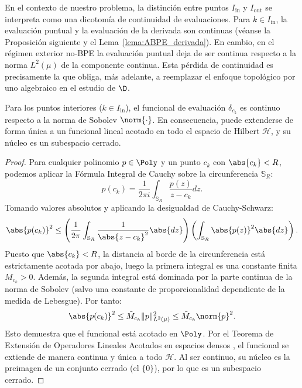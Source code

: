 En el contexto de nuestro problema, la distinción entre puntos $I_{\mathrm{in}}$ y $I_{\mathrm{out}}$ se interpreta como una dicotomía de continuidad de evaluaciones. Para $k\in I_{\mathrm{in}}$, la evaluación puntual y la evaluación de la derivada son continuas (véanse la Proposición siguiente y el Lema~\ref{lema:ABPE_derivada}). En cambio, en el régimen exterior no-BPE la evaluación puntual deja de ser continua respecto a la norma $L^2(\mu)$ de la componente continua. Esta pérdida de continuidad es precisamente la que obliga, más adelante, a reemplazar el enfoque topológico por uno algebraico en el estudio de $\D$.

\begin{prop}
	Para los puntos interiores ($k \in I_{\mathrm{in}}$), el funcional de evaluación $\delta_{c_k}$ es continuo respecto a la norma de Sobolev $\norm{\cdot}$. En consecuencia, puede extenderse de forma única a un funcional lineal acotado en todo el espacio de Hilbert $\mathcal{H}$, y su núcleo es un subespacio cerrado.
\end{prop}

\begin{proof}
	Para cualquier polinomio $p \in \Poly$ y un punto $c_k$ con $\abs{c_k} < R$, podemos aplicar la Fórmula Integral de Cauchy sobre la circunferencia $\mathbb{S}_R$:
	$$ p(c_k) = \frac{1}{2\pi i} \int_{\mathbb{S}_R} \frac{p(z)}{z - c_k} dz. $$
	Tomando valores absolutos y aplicando la desigualdad de Cauchy-Schwarz:
	$$ \abs{p(c_k)}^2 \leq \left( \frac{1}{2\pi} \int_{\mathbb{S}_R} \frac{1}{\abs{z - c_k}^2} \abs{dz} \right) \left( \int_{\mathbb{S}_R} \abs{p(z)}^2 \abs{dz} \right). $$
	Puesto que $\abs{c_k} < R$, la distancia al borde de la circunferencia está estrictamente acotada por abajo, luego la primera integral es una constante finita $M_{c_k} > 0$. Además, la segunda integral está dominada por la parte continua de la norma de Sobolev (salvo una constante de proporcionalidad dependiente de la medida de Lebesgue). Por tanto:
	$$ \abs{p(c_k)}^2 \leq \tilde{M}_{c_k} \|p\|_{L^2(\mu)}^2 \leq \tilde{M}_{c_k} \norm{p}^2. $$
	Esto demuestra que el funcional está acotado en $\Poly$. Por el Teorema de Extensión de Operadores Lineales Acotados en espacios densos \cite{kreyszig1989introductory}, el funcional se extiende de manera continua y única a todo $\mathcal{H}$. Al ser continuo, su núcleo es la preimagen de un conjunto cerrado (el $\{0\}$), por lo que es un subespacio cerrado.
\end{proof}

